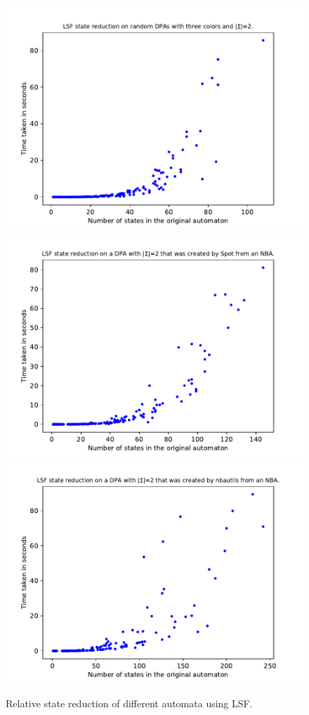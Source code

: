 \begin{figure}
\begin{minipage}{0.49\textwidth}
		\caption{Relative state reduction of different automata using LSF.}
		\label{exp:fig:lsf_reduct_sccs}
	\end{minipage}
	\hfill
	\begin{minipage}{0.49\textwidth}
		\includegraphics[page=5,height=.3\textheight]{../data/analysis/lsf/gendet_ap1.pdf} 
		\includegraphics[page=5,height=.3\textheight]{../data/analysis/lsf/detspot_ap1.pdf} 
		\includegraphics[page=5,height=.3\textheight]{../data/analysis/lsf/detnbaut_ap1.pdf} 

\end{minipage}
\end{figure}
